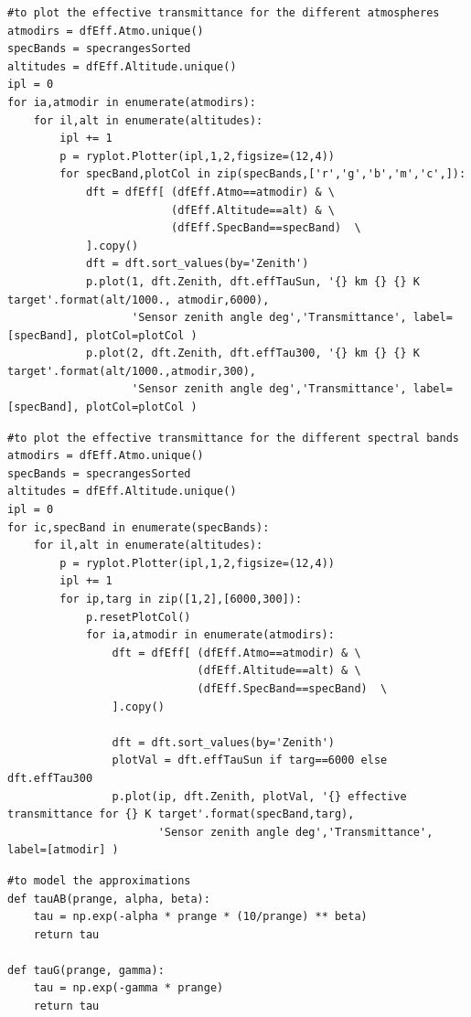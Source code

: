 \documentclass{workpackage}
\begin{document}
\begin{lstlisting}[style=incellstyle,caption={Code Listing in cell 43 \label{lst:autolistingcell43}}]
#to plot the effective transmittance for the different atmospheres
atmodirs = dfEff.Atmo.unique()
specBands = specrangesSorted
altitudes = dfEff.Altitude.unique()
ipl = 0
for ia,atmodir in enumerate(atmodirs):
    for il,alt in enumerate(altitudes):
        ipl += 1
        p = ryplot.Plotter(ipl,1,2,figsize=(12,4))
        for specBand,plotCol in zip(specBands,['r','g','b','m','c',]):
            dft = dfEff[ (dfEff.Atmo==atmodir) & \
                         (dfEff.Altitude==alt) & \
                         (dfEff.SpecBand==specBand)  \
            ].copy()
            dft = dft.sort_values(by='Zenith')
            p.plot(1, dft.Zenith, dft.effTauSun, '{} km {} {} K target'.format(alt/1000., atmodir,6000),
                   'Sensor zenith angle deg','Transmittance', label=[specBand], plotCol=plotCol )
            p.plot(2, dft.Zenith, dft.effTau300, '{} km {} {} K target'.format(alt/1000.,atmodir,300),
                   'Sensor zenith angle deg','Transmittance', label=[specBand], plotCol=plotCol )
\end{lstlisting}


\begin{lstlisting}[style=incellstyle,caption={Code Listing in cell 44 \label{lst:autolistingcell44}}]
#to plot the effective transmittance for the different spectral bands
atmodirs = dfEff.Atmo.unique()
specBands = specrangesSorted
altitudes = dfEff.Altitude.unique()
ipl = 0
for ic,specBand in enumerate(specBands):
    for il,alt in enumerate(altitudes):
        p = ryplot.Plotter(ipl,1,2,figsize=(12,4))
        ipl += 1
        for ip,targ in zip([1,2],[6000,300]):
            p.resetPlotCol()
            for ia,atmodir in enumerate(atmodirs):
                dft = dfEff[ (dfEff.Atmo==atmodir) & \
                             (dfEff.Altitude==alt) & \
                             (dfEff.SpecBand==specBand)  \
                ].copy()

                dft = dft.sort_values(by='Zenith')
                plotVal = dft.effTauSun if targ==6000 else dft.effTau300
                p.plot(ip, dft.Zenith, plotVal, '{} effective transmittance for {} K target'.format(specBand,targ),
                       'Sensor zenith angle deg','Transmittance', label=[atmodir] )
\end{lstlisting}


\begin{lstlisting}[style=incellstyle,caption={Code Listing in cell 46 \label{lst:autolistingcell46}}]
#to model the approximations
def tauAB(prange, alpha, beta):
    tau = np.exp(-alpha * prange * (10/prange) ** beta)
    return tau

def tauG(prange, gamma):
    tau = np.exp(-gamma * prange)
    return tau
\end{lstlisting}
\end{document}
